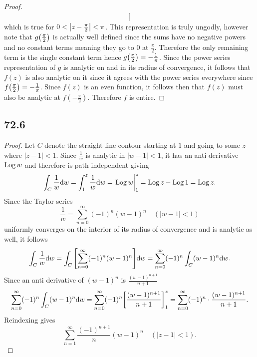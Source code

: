 \documentclass[12pt]{extarticle}
\begin{document}
\begin{proof}
\begin{align*}
        ] 
    \end{align*}
    which is true for $0 < \qty|z-\frac{\pi}{2}| < \pi$. This representation is truly ungodly, however note that $g\qty(\frac{\pi}{2})$ is actually well defined since the sums have no negative powers and no constant terms meaning they go to $0$ at $\frac{\pi}{2}$. Therefore the only remaining term is the single constant term hence $g\qty(\frac{\pi}{2}) = -\frac{1}{\pi}$. Since the power series representation of $g$ is analytic on and in its radius of convergence, it follows that $f(z)$ is also analytic on it since it agrees with the power series everywhere since $f\qty(\frac{\pi}{2}) = -\frac{1}{\pi}$. Since $f(z)$ is an even function, it follows then that $f(z)$ must also be analytic at $f(-\frac{\pi}{2})$. Therefore $f$ is entire.
\end{proof}

\subsection*{72.6}
\begin{proof}
    Let $C$ denote the straight line contour starting at $1$ and going to some $z$ where $|z-1|<1$. Since $\frac{1}{w}$ is analytic in $|w-1|<1$, it has an anti derivative $\operatorname{Log} w$ and therefore is path independent giving
    \[
        \int_C \frac{1}{w} \dd w = \int_{1}^z \frac{1}{w} \dd w = \eval{\Log w}_1^z = \Log z - \Log 1 = \Log z
    .\]
    Since the Taylor series
    \[
        \frac{1}{w} = \sum_{n=0}^{\infty} (-1)^n (w-1)^n \hspace{1em} (|w-1|<1)
    \]
    uniformly converges on the interior of its radius of convergence and is analytic as well, it follows
    \[
        \int_C \frac{1}{w} \dd w = \int_C \qty[\sum_{n=0}^{\infty} (-1)^n (w-1)^n] \dd w = \sum_{n=0}^\infty (-1)^n \int_C (w-1)^n \dd w
    .\]
    Since an anti derivative of $(w-1)^n$ is $\frac{(w-1)^{n+1}}{n+1}$
    \[
        \sum_{n=0}^\infty (-1)^n \int_C (w-1)^n \dd w = \sum_{n=0}^\infty (-1)^n \qty[\frac{(w-1)^{n+1}}{n+1}]_1^z = \sum_{n=0}^\infty (-1)^n \cdot \frac{(w-1)^{n+1}}{n+1}
    .\]
    Reindexing gives
    \[
        \sum_{n=1}^\infty \frac{(-1)^{n+1}}{n} (w-1)^n \hspace{1em} (|z-1| < 1)
    .\]
\end{proof}
\end{document}

